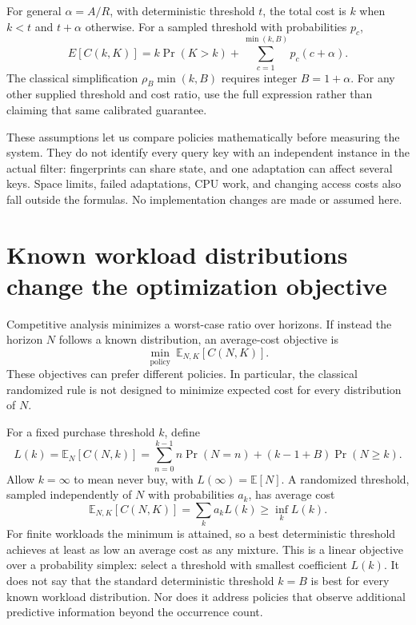 \documentclass[11pt]{article}
\begin{document}
For general $\alpha=A/R$, with deterministic threshold $t$, the total cost is $k$ when $k<t$ and $t+\alpha$ otherwise. For a sampled threshold with probabilities $p_c$,
\[
E[C(k,K)]=k\Pr(K>k)+\sum_{c=1}^{\min(k,B)}p_c(c+\alpha).
\]
The classical simplification $\rho_B\min(k,B)$ requires integer $B=1+\alpha$. For any other supplied threshold and cost ratio, use the full expression rather than claiming that same calibrated guarantee.

These assumptions let us compare policies mathematically before measuring the system. They do not identify every query key with an independent instance in the actual filter: fingerprints can share state, and one adaptation can affect several keys. Space limits, failed adaptations, CPU work, and changing access costs also fall outside the formulas. No implementation changes are made or assumed here.

\section{Known workload distributions change the optimization objective}
Competitive analysis minimizes a worst-case ratio over horizons. If instead the horizon $N$ follows a known distribution, an average-cost objective is
\[
\min_{\text{policy}}\ \mathbb E_{N,K}[C(N,K)].
\]
These objectives can prefer different policies. In particular, the classical randomized rule is not designed to minimize expected cost for every distribution of $N$.

For a fixed purchase threshold $k$, define
\[
L(k)=\mathbb E_N[C(N,k)]
=\sum_{n=0}^{k-1}n\Pr(N=n)+(k-1+B)\Pr(N\ge k).
\]
Allow $k=\infty$ to mean never buy, with $L(\infty)=\mathbb E[N]$. A randomized threshold, sampled independently of $N$ with probabilities $a_k$, has average cost
\[
\mathbb E_{N,K}[C(N,K)]=\sum_k a_kL(k)\ge\inf_k L(k).
\]
For finite workloads the minimum is attained, so a best deterministic threshold achieves at least as low an average cost as any mixture. This is a linear objective over a probability simplex: select a threshold with smallest coefficient $L(k)$. It does not say that the standard deterministic threshold $k=B$ is best for every known workload distribution. Nor does it address policies that observe additional predictive information beyond the occurrence count.
\end{document}

